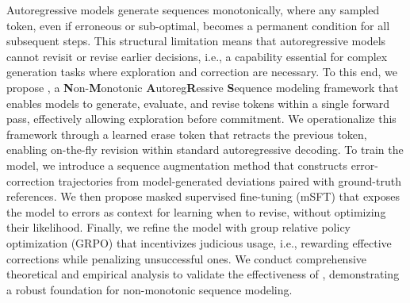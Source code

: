 Autoregressive models generate sequences monotonically, where any sampled token, even if erroneous or sub-optimal, becomes a permanent condition for all subsequent steps.
This structural limitation means that autoregressive models cannot revisit or revise earlier decisions, i.e., a capability essential for complex generation tasks where exploration and correction are necessary.
To this end, we propose \textbf{\modelname}, a \textbf{N}on-\textbf{M}onotonic \textbf{A}utoreg\textbf{R}essive \textbf{S}equence modeling framework that enables models to generate, evaluate, and revise tokens within a single forward pass, effectively allowing exploration before commitment.
We operationalize this framework through a learned erase token \bk that retracts the previous token, enabling on-the-fly revision within standard autoregressive decoding.
To train the model, we introduce a sequence augmentation method that constructs error-correction trajectories from model-generated deviations paired with ground-truth references.
We then propose masked supervised fine-tuning (mSFT) that exposes the model to errors as context for learning when to revise, without optimizing their likelihood.
Finally, we refine the model with group relative policy optimization (GRPO) that incentivizes judicious \bk usage, i.e., rewarding effective corrections while penalizing unsuccessful ones. 
We conduct comprehensive theoretical and empirical analysis to validate the effectiveness of \modelname, demonstrating a robust foundation for non-monotonic sequence modeling.